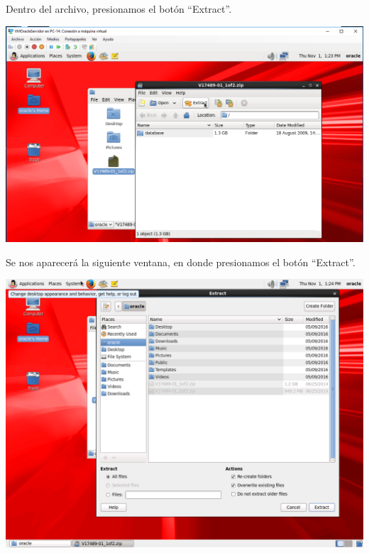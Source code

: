Dentro del archivo, presionamos el botón “Extract”.
\begin{center}
	\includegraphics[width=16cm]{./Imagenes/59} 
\end{center} 

\vspace{\baselineskip}

Se nos aparecerá la siguiente ventana, en donde presionamos el botón “Extract”.
\begin{center}
	\includegraphics[width=16cm]{./Imagenes/60} 
\end{center} 

\vspace{\baselineskip}

